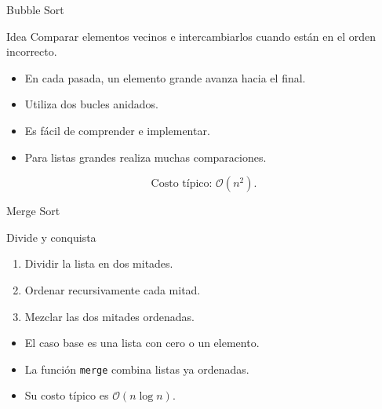 \documentclass[10pt]{beamer}
\begin{document}
\begin{frame}{Bubble Sort}
  \begin{block}{Idea}
    Comparar elementos vecinos e intercambiarlos cuando están en el orden incorrecto.
  \end{block}

  \begin{itemize}
    \item En cada pasada, un elemento grande avanza hacia el final.
    \item Utiliza dos bucles anidados.
    \item Es fácil de comprender e implementar.
    \item Para listas grandes realiza muchas comparaciones.
  \end{itemize}

  \[
    \text{Costo típico: }\mathcal{O}(n^2).
  \]
\end{frame}

\begin{frame}{Merge Sort}
  \begin{block}{Divide y conquista}
    \begin{enumerate}
      \item Dividir la lista en dos mitades.
      \item Ordenar recursivamente cada mitad.
      \item Mezclar las dos mitades ordenadas.
    \end{enumerate}
  \end{block}

  \begin{itemize}
    \item El caso base es una lista con cero o un elemento.
    \item La función \texttt{merge} combina listas ya ordenadas.
    \item Su costo típico es \(\mathcal{O}(n\log n)\).
  \end{itemize}
\end{frame}
\end{document}
